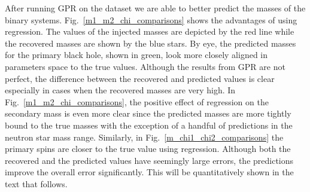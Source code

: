 \documentclass[aps,prd,twocolumn,superscriptaddress,preprintnumbers,floatfix,nofootinbib]{revtex4-2}
\begin{document}
After running GPR on the dataset we are able to better predict the masses of
the binary systems. Fig.~\ref{m1_m2_chi_comparisons} shows the advantages of 
using regression. The values of the injected masses are depicted by the red 
line while the recovered masses are shown by the blue stars. By eye, the 
predicted masses for the primary black hole, shown in green, look more closely 
aligned in parameters space to the true values. Although the results from GPR 
are not perfect, the difference between the recovered and predicted values is 
clear especially in cases when the recovered masses are very high. In 
Fig.~\ref{m1_m2_chi_comparisons}, the positive effect of regression on the 
secondary mass is even more clear since the predicted masses are more tightly 
bound to the true masses with the exception of a handful of predictions in the 
neutron star mass range. Similarly, in Fig.~\ref{m_chi1_chi2_comparisons} the 
primary spins are closer to the true value using regression. Although both the 
recovered and the predicted values have seemingly large errors, the predictions 
improve the overall error significantly. This will be quantitatively shown in 
the text that follows.
\end{document}
